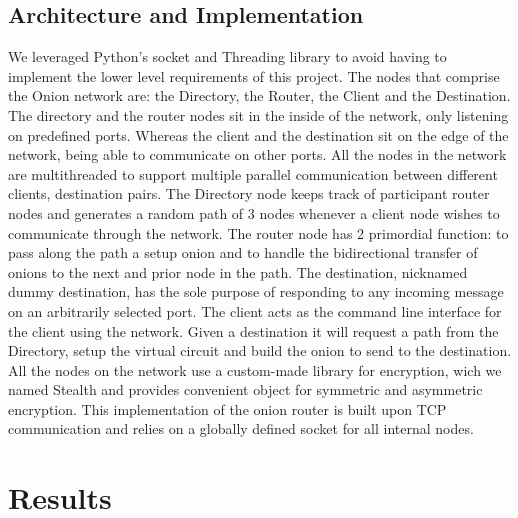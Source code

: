 \documentclass[10pt]{report}
\begin{document}
\section{Architecture and Implementation}
We leveraged Python’s socket and Threading library to avoid having to implement the lower level requirements of this project.
The nodes that comprise the Onion network are: the Directory, the Router, the Client and the Destination.
The directory and the router nodes sit in the inside of the network, only listening on predefined ports.
Whereas the client and the destination sit on the edge of the network, being able to communicate on other ports.
All the nodes in the network are multithreaded to support multiple parallel communication between different clients, destination pairs.
The Directory node keeps track of participant router nodes and generates a random path of 3 nodes whenever a client node wishes to communicate through the network.
The router node has 2 primordial function: to pass along the path a setup onion and to handle the bidirectional transfer of onions to the next and prior node in the path.
The destination, nicknamed dummy destination, has the sole purpose of responding to any incoming message on an arbitrarily selected port.
The client acts as the command line interface for the client using the network. Given a destination it will request a path from the Directory, setup the virtual circuit and build the onion to send to the destination.
All the nodes on the network use a custom-made library for encryption, wich we named Stealth and provides convenient object for symmetric and asymmetric encryption.
This implementation of the onion router is built upon TCP communication and relies on a globally defined socket for all internal nodes.\\


\chapter{Results}
\end{document}
